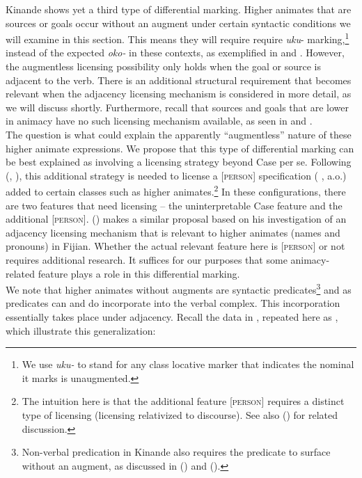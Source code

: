 \documentclass[output=paper]{langscibook}
\begin{document}
Kinande shows yet a third type of differential marking. Higher animates that are sources or goals occur without an augment under certain syntactic conditions we will examine in this section. This means they will require require \textit{uku}- marking,\footnote{We use \textit{uku- }to stand for any class locative marker that indicates the nominal it marks is unaugmented.} instead of the expected \textit{oko-} in these contexts, as exemplified in  and . However, the augmentless licensing possibility only holds when the goal or source is adjacent to the verb. There is an additional structural requirement that becomes relevant when the adjacency licensing mechanism is considered in more detail, as we will discuss shortly. Furthermore, recall that sources and goals that are lower in animacy have no such licensing mechanism available, as seen in  and .\\
\indent The question is what could explain the apparently ``augmentless'' nature of these higher animate expressions. We propose that this type of differential marking can be best explained as involving a licensing strategy beyond Case per se. Following \citeauthor{Irimia2018} (\citeyear{Irimia2018}, \citeyear{IrimiaToAppear}), this additional strategy is needed to license a \textsc{[person]} specification (\citeauthor{Richards2008} \citeyear{Richards2008}, a.o.) added to certain classes such as higher animates.\footnote{The intuition here is that the additional feature \textsc{[person]} requires a distinct type of licensing (licensing relativized to discourse). See also \citeauthor{Miyagawa2017} (\citeyear{Miyagawa2017}) for related discussion. } In these configurations, there are two features that need licensing – the uninterpretable Case feature and the additional \textsc{[person]}. \citeauthor{VanUrk2020} (\citeyear{VanUrk2020}) makes a similar proposal based on his investigation of an adjacency licensing mechanism that is relevant to higher animates (names and pronouns) in Fijian. Whether the actual relevant feature here is \textsc{[person]} or not requires additional research. It suffices for our purposes that some animacy-related feature plays a role in this differential marking. \\
\indent We note that higher animates without augments are syntactic predicates\footnote{Non-verbal predication in Kinande also requires the predicate to surface without an augment, as discussed in \citeauthor{Progovac1993} (\citeyear{Progovac1993}) and \citeauthor{Schneider-Zioga2018} (\citeyear{Schneider-Zioga2018}). } and as predicates can and do incorporate into the verbal complex. This incorporation essentially takes place under adjacency. Recall the data in , repeated here as , which illustrate this generalization:
\end{document}
